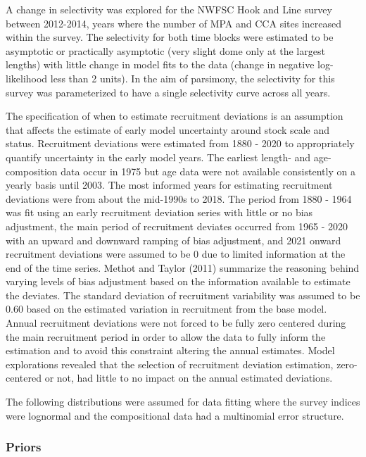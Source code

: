 \documentclass[11pt,
  english,
  letterpaper,
]{article}
\begin{document}
A change in selectivity was explored for the NWFSC Hook and Line survey between 2012-2014, years where the number of MPA and CCA sites increased within the survey. The selectivity for both time blocks were estimated to be asymptotic or practically asymptotic (very slight dome only at the largest lengths) with little change in model fits to the data (change in negative log-likelihood less than 2 units). In the aim of parsimony, the selectivity for this survey was parameterized to have a single selectivity curve across all years.

The specification of when to estimate recruitment deviations is an assumption that affects the estimate of early model uncertainty around stock scale and status. Recruitment deviations were estimated from 1880 - 2020 to appropriately quantify uncertainty in the early model years. The earliest length- and age-composition data occur in 1975 but age data were not available consistently on a yearly basis until 2003. The most informed years for estimating recruitment deviations were from about the mid-1990s to 2018. The period from 1880 - 1964 was fit using an early recruitment deviation series with little or no bias adjustment, the main period of recruitment deviates occurred from 1965 - 2020 with an upward and downward ramping of bias adjustment, and 2021 onward recruitment deviations were assumed to be 0 due to limited information at the end of the time series. Methot and Taylor (2011) summarize the reasoning behind varying levels of bias adjustment based on the information available to estimate the deviates. The standard deviation of recruitment variability was assumed to be 0.60 based on the estimated variation in recruitment from the base model. Annual recruitment deviations were not forced to be fully zero centered during the main recruitment period in order to allow the data to fully inform the estimation and to avoid this constraint altering the annual estimates. Model explorations revealed that the selection of recruitment deviation estimation, zero-centered or not, had little to no impact on the annual estimated deviations.

The following distributions were assumed for data fitting where the survey indices were lognormal and the compositional data had a multinomial error structure.

\hypertarget{priors}{%
\subsubsection{Priors}\label{priors}}
\end{document}
